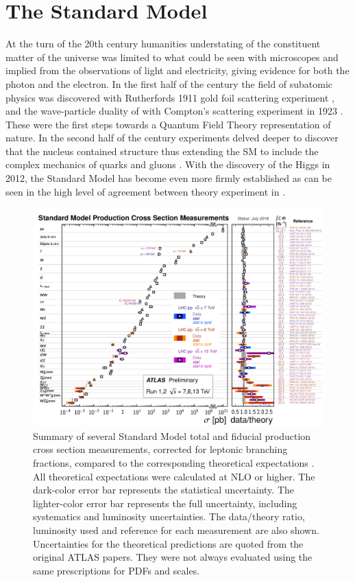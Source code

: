 \section{The Standard Model} \label{sec:theory:standardmodel}

At the turn of the 20th century humanities understating of the constituent
matter of the universe was limited to what could be seen with microscopes and
implied from the observations of light and electricity, giving evidence for
both the photon and the electron.  In the first half of the century the field
of subatomic physics was discovered with Rutherfords 1911 gold foil scattering
experiment \cite{Rutherford:1911zz}, and the wave-particle duality of with
Compton's scattering experiment in 1923 \cite{PhysRev.21.483}. These were the
first steps towards a Quantum Field Theory representation of nature.  In the
second half of the century experiments delved deeper to discover that the
nucleus contained structure thus extending the SM to include the complex
mechanics of quarks and gluons \cite{Fritzsch:1972jv}.  With the discovery of
the Higgs in 2012, the Standard Model has become even more firmly established
as can be seen in the high level of agreement between theory experiment in
.

\begin{figure}[!htbp]
  \begin{center}
    \includegraphics[width=\linewidth]{figures/theory/xsection_measurements.pdf}
\caption{ Summary of several Standard Model total and fiducial production cross
section measurements, corrected for leptonic branching fractions, compared to
the corresponding theoretical expectations \cite{StandardModelPublicResults}.
All theoretical expectations were calculated at NLO or higher. The dark-color
error bar represents the statistical uncertainty. The lighter-color error bar
represents the full uncertainty, including systematics and luminosity
uncertainties. The data/theory ratio, luminosity used and reference for each
measurement are also shown. Uncertainties for the theoretical predictions are
quoted from the original ATLAS papers. They were not always evaluated using the
same prescriptions for PDFs and scales.}
    \label{fig:xsection_measurements}
  \end{center}
\end{figure}


